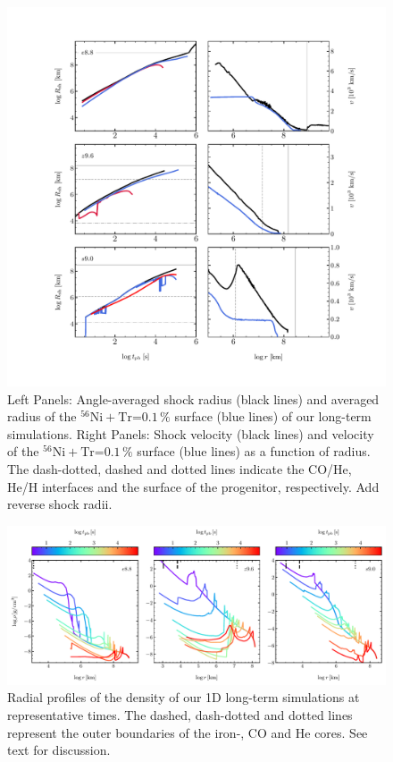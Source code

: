 \documentclass[fleqn,usenatbib]{mnras}
\newcommand{\nickel}{\ensuremath{\mathrm{^{56}Ni}}\xspace}
\newcommand{\tracer}{\ensuremath{\mathrm{Tr}}\xspace}
\newcommand{\COM}[1]{{\color{orange}#1}}
\begin{document}
\begin{figure}
 \centering
 \includegraphics[width=\textwidth, trim=0cm 1.0cm 0cm 1.0cm,clip]{pic/radii_velocity_shock_nickel.pdf}
 \caption{Left Panels: Angle-averaged shock radius (black lines) and averaged radius of the $\nickel+\tracer\mathord{=}0.1\,\%$ surface (blue lines) of our long-term simulations. Right Panels: Shock velocity (black lines) and velocity of the $\nickel+\tracer\mathord{=}0.1\,\%$ surface (blue lines) as a function of radius. The dash-dotted, dashed and dotted lines indicate the CO/He, He/H interfaces and the surface of the progenitor, respectively. \COM{Add reverse shock radii.}}
 \label{fig:radii all times}
\end{figure}

\begin{figure}
 \centering
 \includegraphics[width=\textwidth, trim=0cm 0.0cm 0cm 0.0cm,clip]{pic/density_profiles_1d_long_term.pdf}
 \caption{Radial profiles of the density of our 1D long-term simulations at representative times. The dashed, dash-dotted and dotted lines represent the outer boundaries of the iron-, CO and He cores. See text for discussion.}
 \label{fig:density profiles all times}
\end{figure}
\end{document}

